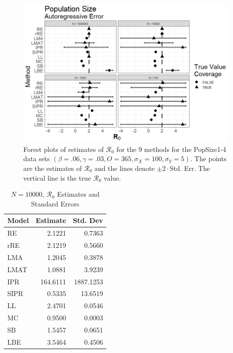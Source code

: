 \documentclass[12pt]{article}
\newcommand{\xxsir}{\ensuremath{9} } %
\newcommand{\rr}{\ensuremath{\mathcal{R}_0}}
\begin{document}
\begin{figure}[H]
	\centering
	\includegraphics[scale=0.5]{images/popsize_ar.tiff}
	\caption{Forest plots of estimates of $\rr$ for the \xxsir methods for the PopSize1-4 data sets $(\beta=.06, \gamma=.03, O=365, \sigma_X=100, \sigma_Y=5)$.  The points are the estimates of $\rr$ and the lines denote $\pm 2\cdot $Std. Err.  The vertical line is the true $\rr$ value.}
\end{figure}

\begin{table}[H]
	
	\centering
	\begin{tabular}[t]{l|r|r}
		\hline
		Model & Estimate & Std. Dev\\
		\hline
		RE & 2.1221 & 0.7363\\
		\hline
		rRE & 2.1219 & 0.5660\\
		\hline
		LMA & 1.2045 & 0.3878\\
		\hline
		LMAT & 1.0881 & 3.9239\\
		\hline
		IPR & 164.6111 & 1887.1253\\
		\hline
		SIPR & 0.5335 & 13.6519\\
		\hline
		LL & 2.4701 & 0.0546\\
		\hline
		MC & 0.9500 & 0.0003\\
		\hline
		SB & 1.5457 & 0.0651\\
		\hline
		LBE & 3.5464 & 0.4506\\
		\hline
	\end{tabular}
	\caption{$N = 10000$, $\rr$ Estimates and Standard Errors}
\end{table}
\end{document}
